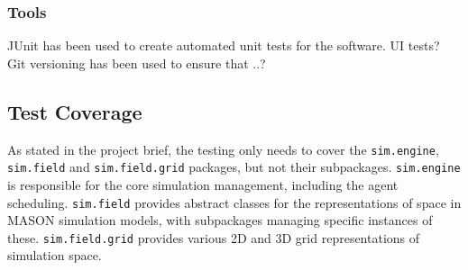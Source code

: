 \documentclass{article}
\begin{document}
\subsubsection{Tools}
JUnit has been used to create automated unit tests for the software.
UI tests?
Git versioning has been used to ensure that ..?

\subsection{Test Coverage}
As stated in the project brief, the testing only needs to cover the \texttt{sim.engine}, \texttt{sim.field} and \texttt{sim.field.grid} packages, but not their subpackages.
\texttt{sim.engine} is responsible for the core simulation management, including the agent scheduling.
\texttt{sim.field} provides abstract classes for the representations of space in MASON simulation models, with subpackages managing specific instances of these.
\texttt{sim.field.grid} provides various 2D and 3D grid representations of simulation space.


\end{document}

